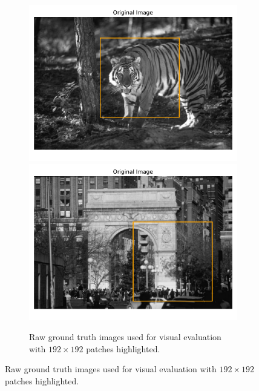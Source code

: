 \begin{figure}[p]
    \centering
    \begin{subfigure}{\textwidth}
        \centering
        \includegraphics[trim={0 0.35cm 0 0.85cm},clip,width=0.49\linewidth]{img/ch6/n2n_imagenet/ground_truth_1.pdf}
        \includegraphics[trim={0 0.35cm 0 0.85cm},clip,width=0.49\linewidth]{img/ch6/n2n_imagenet/ground_truth_2.pdf}
        \caption{Raw ground truth images used for visual evaluation with $192 \times 192$ patches highlighted.}
        \label{fig:n2n-recreation-ground-truth}
    \end{subfigure}

    \vspace{0.5cm}


\end{figure}
